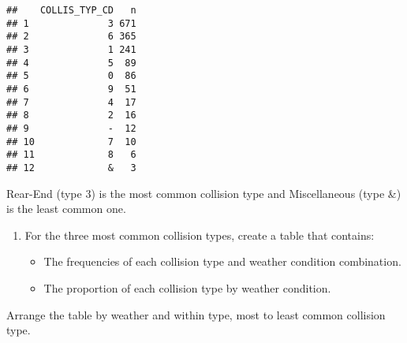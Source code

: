 \documentclass[]{article}
\newenvironment{Shaded}{\begin{snugshade}}{\end{snugshade}}
\newcommand{\KeywordTok}[1]{\textcolor[rgb]{0.13,0.29,0.53}{\textbf{#1}}}
\newcommand{\DataTypeTok}[1]{\textcolor[rgb]{0.13,0.29,0.53}{#1}}
\newcommand{\StringTok}[1]{\textcolor[rgb]{0.31,0.60,0.02}{#1}}
\newcommand{\OperatorTok}[1]{\textcolor[rgb]{0.81,0.36,0.00}{\textbf{#1}}}
\newcommand{\NormalTok}[1]{#1}
\providecommand{\tightlist}{%
  \setlength{\itemsep}{0pt}\setlength{\parskip}{0pt}}
\begin{document}
\begin{verbatim}
##    COLLIS_TYP_CD   n
## 1              3 671
## 2              6 365
## 3              1 241
## 4              5  89
## 5              0  86
## 6              9  51
## 7              4  17
## 8              2  16
## 9              -  12
## 10             7  10
## 11             8   6
## 12             &   3
\end{verbatim}

Rear-End (type 3) is the most common collision type and Miscellaneous
(type \&) is the least common one.

\begin{enumerate}
\def\labelenumi{\alph{enumi}.}
\setcounter{enumi}{1}
\tightlist
\item
  For the three most common collision types, create a table that
  contains:

  \begin{itemize}
  \tightlist
  \item
    The frequencies of each collision type and weather condition
    combination.
  \item
    The proportion of each collision type by weather condition.
  \end{itemize}
\end{enumerate}

Arrange the table by weather and within type, most to least common
collision type.

\begin{Shaded}
\end{Shaded}
\end{document}

